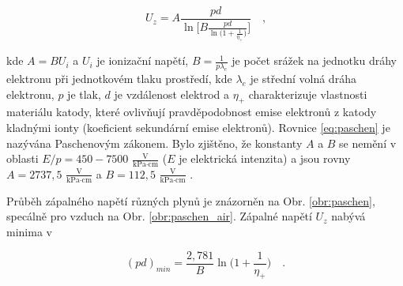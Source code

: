 \begin{equation} 
U_z=A \frac{pd}{\ln \Big[ B \frac{pd}{\ln \big( 1+ \frac{1}{\eta_+} \big)} \Big]} \quad \text{,}
\label{eq:paschen}
\end{equation}

kde $A=BU_i$ a $U_i$ je ionizační napětí, $B=\frac{1}{p\lambda_e}$ je počet srážek na jednotku dráhy elektronu při jednotkovém tlaku prostředí, kde $\lambda_e$ je střední volná dráha elektronu, $p$ je tlak, $d$ je vzdálenost elektrod a $\eta_+$ charakterizuje vlastnosti materiálu katody, které ovlivňují pravděpodobnost emise elektronů z katody kladnými ionty (koeficient sekundární emise elektronů). Rovnice \eqref{eq:paschen} je nazývána Paschenovým zákonem. Bylo zjištěno, že konstanty $A$ a $B$ se nemění v oblasti $E/p=450-7500$ $\frac{\text{V}}{\text{kPa} \cdot \text{cm}}$ ($E$ je elektrická intenzita) a jsou rovny $A=2737,5$ $\frac{\text{V}}{\text{kPa} \cdot \text{cm}}$ a $B=112,5$ $\frac{\text{V}}{\text{kPa} \cdot \text{cm}}$ \cite{Husain1982}.
\par Průběh zápalného napětí různých plynů je znázorněn na Obr. \ref{obr:paschen}, specálně pro vzduch na Obr. \ref{obr:paschen_air}. Zápalné napětí $U_z$ nabývá minima v \cite{kracik}

\begin{equation}
(pd)_{min}=\frac{2,781}{B} \ln \Big( 1+ \frac{1}{\eta_+} \Big) \quad \text{.}
\end{equation}


